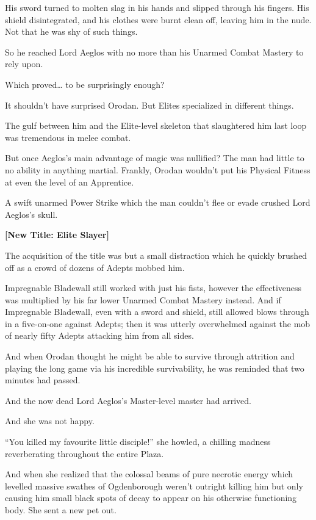 \documentclass[a4paper,10pt]{book}
\begin{document}
His sword turned to molten slag in his hands and slipped through his fingers. His shield disintegrated, and his clothes were burnt clean off, leaving him in the nude. Not that he was shy of such things.\par
So he reached Lord Aeglos with no more than his Unarmed Combat Mastery to rely upon.\par
Which proved… to be surprisingly enough?\par
It shouldn’t have surprised Orodan. But Elites specialized in different things.\par
The gulf between him and the Elite-level skeleton that slaughtered him last loop was tremendous in melee combat.\par
But once Aeglos’s main advantage of magic was nullified? The man had little to no ability in anything martial. Frankly, Orodan wouldn’t put his Physical Fitness at even the level of an Apprentice.\par
A swift unarmed Power Strike which the man couldn’t flee or evade crushed Lord Aeglos’s skull.\par
\textbf{[New Title: Elite Slayer]}\par
The acquisition of the title was but a small distraction which he quickly brushed off as a crowd of dozens of Adepts mobbed him.\par
Impregnable Bladewall still worked with just his fists, however the effectiveness was multiplied by his far lower Unarmed Combat Mastery instead. And if Impregnable Bladewall, even with a sword and shield, still allowed blows through in a five-on-one against Adepts; then it was utterly overwhelmed against the mob of nearly fifty Adepts attacking him from all sides.\par
And when Orodan thought he might be able to survive through attrition and playing the long game via his incredible survivability, he was reminded that two minutes had passed.\par
And the now dead Lord Aeglos’s Master-level master had arrived.\par
And she was not happy.\par
“You killed my favourite little disciple!” she howled, a chilling madness reverberating throughout the entire Plaza.\par
And when she realized that the colossal beams of pure necrotic energy which levelled massive swathes of Ogdenborough weren’t outright killing him but only causing him small black spots of decay to appear on his otherwise functioning body. She sent a new pet out.\par
\end{document}
